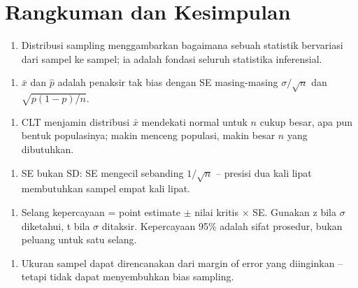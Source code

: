 \documentclass[
  indonesian,
  letterpaper,
]{book}
\providecommand{\tightlist}{%
  \setlength{\itemsep}{0pt}\setlength{\parskip}{0pt}}
\begin{document}
\section{Rangkuman dan Kesimpulan}\label{rangkuman-dan-kesimpulan}

\begin{enumerate}
\def\labelenumi{\arabic{enumi}.}
\tightlist
\item
  Distribusi sampling menggambarkan bagaimana sebuah statistik
  bervariasi dari sampel ke sampel; ia adalah fondasi seluruh statistika
  inferensial.
\end{enumerate}

\begin{enumerate}
\def\labelenumi{\arabic{enumi}.}
\setcounter{enumi}{1}
\tightlist
\item
  \(\bar{x}\) dan \(\hat{p}\) adalah penaksir tak bias dengan SE
  masing-masing \(\sigma/\sqrt{n}\) dan \(\sqrt{p(1-p)/n}\).
\end{enumerate}

\begin{enumerate}
\def\labelenumi{\arabic{enumi}.}
\setcounter{enumi}{2}
\tightlist
\item
  CLT menjamin distribusi \(\bar{x}\) mendekati normal untuk \(n\) cukup
  besar, apa pun bentuk populasinya; makin menceng populasi, makin besar
  \(n\) yang dibutuhkan.
\end{enumerate}

\begin{enumerate}
\def\labelenumi{\arabic{enumi}.}
\setcounter{enumi}{3}
\tightlist
\item
  SE bukan SD: SE mengecil sebanding \(1/\sqrt{n}\) -- presisi dua kali
  lipat membutuhkan sampel empat kali lipat.
\end{enumerate}

\begin{enumerate}
\def\labelenumi{\arabic{enumi}.}
\setcounter{enumi}{4}
\tightlist
\item
  Selang kepercayaan = point estimate \(\pm\) nilai kritis \(\times\)
  SE. Gunakan z bila \(\sigma\) diketahui, t bila \(\sigma\) ditaksir.
  Kepercayaan 95\% adalah sifat prosedur, bukan peluang untuk satu
  selang.
\end{enumerate}

\begin{enumerate}
\def\labelenumi{\arabic{enumi}.}
\setcounter{enumi}{5}
\tightlist
\item
  Ukuran sampel dapat direncanakan dari margin of error yang diinginkan
  -- tetapi tidak dapat menyembuhkan bias sampling.
\end{enumerate}
\end{document}
